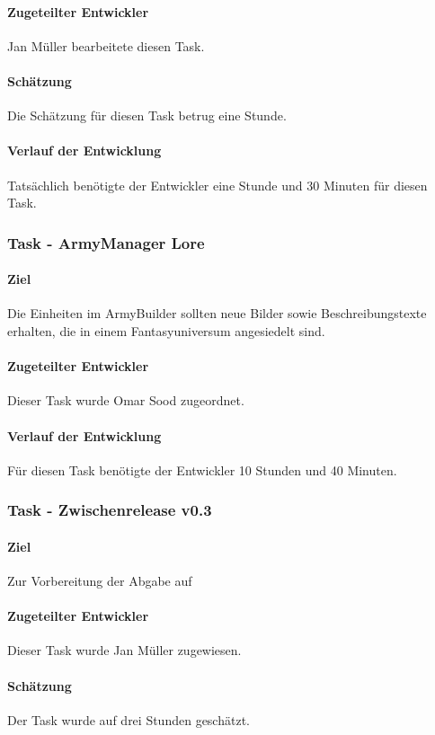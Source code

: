 \documentclass[12pt, titlepage]{scrartcl}
\begin{document}
			\paragraph{Zugeteilter Entwickler} Jan Müller bearbeitete diesen Task.
			\paragraph{Schätzung} Die Schätzung für diesen Task betrug eine Stunde.
			\paragraph{Verlauf der Entwicklung} Tatsächlich benötigte der Entwickler eine Stunde und 30 Minuten für diesen Task.
			\subsubsection{Task - ArmyManager Lore}
			\paragraph{Ziel} Die Einheiten im ArmyBuilder sollten neue Bilder sowie Beschreibungstexte erhalten, die in einem Fantasyuniversum angesiedelt sind.
			\paragraph{Zugeteilter Entwickler} Dieser Task wurde Omar Sood zugeordnet.
			\paragraph{Verlauf der Entwicklung} Für diesen Task benötigte der Entwickler 10 Stunden und 40 Minuten.
			\subsubsection{Task - Zwischenrelease v0.3}
			\paragraph{Ziel} Zur Vorbereitung der Abgabe auf 
			\paragraph{Zugeteilter Entwickler} Dieser Task wurde Jan Müller zugewiesen.
			\paragraph{Schätzung} Der Task wurde auf drei Stunden geschätzt.
\end{document}
